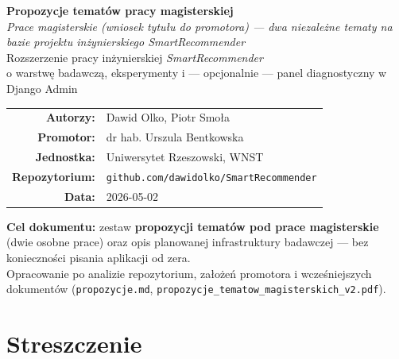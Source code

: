 \documentclass[a4paper,11pt]{article}
\begin{document}
\setcounter{tocdepth}{3}

\begin{titlepage}
\centering
\vspace*{2cm}

{\Large\bfseries Propozycje tematów pracy magisterskiej}\\[0.4cm]
{\normalsize\itshape Prace magisterskie (wniosek tytułu do promotora) --- dwa niezależne tematy na bazie projektu inżynierskiego \emph{SmartRecommender}}\\[1.0cm]

{\large Rozszerzenie pracy inżynierskiej \emph{SmartRecommender}\\
o warstwę badawczą, eksperymenty i --- opcjonalnie --- panel diagnostyczny w Django Admin}\\[2.2cm]

\begin{tabular}{rl}
\textbf{Autorzy:} & Dawid Olko, Piotr Smoła\\[4pt]
\textbf{Promotor:} & dr hab. Urszula Bentkowska\\[4pt]
\textbf{Jednostka:} & Uniwersytet Rzeszowski, WNST\\[4pt]
\textbf{Repozytorium:} & \texttt{github.com/dawidolko/SmartRecommender}\\[4pt]
\textbf{Data:} & 2026-05-02\\
\end{tabular}

\vfill

{\small\textbf{Cel dokumentu:} zestaw \textbf{propozycji tematów pod prace magisterskie} (dwie osobne prace) oraz opis planowanej infrastruktury badawczej --- bez konieczności pisania aplikacji od zera.\\[0.75em]
\footnotesize Opracowanie po analizie repozytorium, założeń promotora i wcześniejszych dokumentów (\texttt{propozycje.md}, \texttt{propozycje\_tematow\_magisterskich\_v2.pdf}).}
\end{titlepage}

\tableofcontents
\newpage

\section*{Streszczenie}
\end{document}

